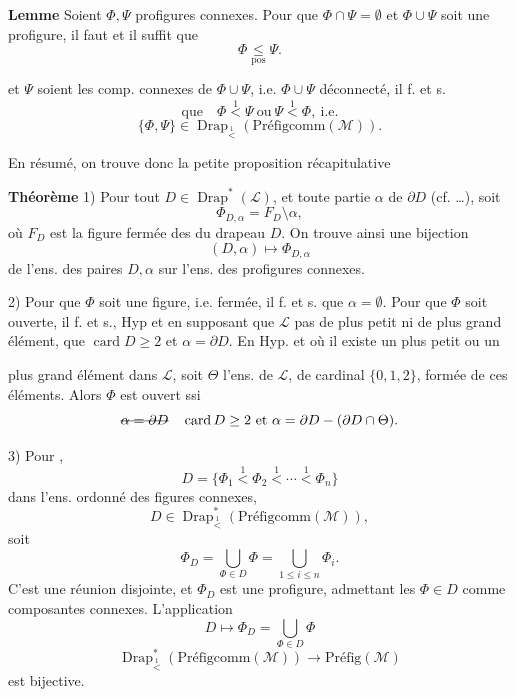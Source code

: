 \documentclass[11pt,a4paper]{article}
\begin{document}
\textbf{Lemme} Soient $\Phi,\Psi$ profigures connexes. Pour que $\Phi\cap\Psi=\emptyset$ et $\Phi\cup\Psi$ soit une profigure,  il faut et il suffit que
\[ \Phi \underset{\mathrm{pos}}{\leq} \Psi . \]
 \struck{\ill{}}

et $\Psi$ soient les comp. connexes de $\Phi\cup\Psi$, i.e. $\Phi\cup\Psi$ déconnecté, il f. et s.
\[ \text{que}\quad \Phi \overset{1}{<} \Psi \ \text{ou}\ \Psi \overset{1}{<} \Phi, \ \text{i.e.} \]
\[ \{\Phi,\Psi\} \in \operatorname{Drap}_{\overset{1}{<}}(\text{Préfigcomm}(\mathcal{M})) . \]

En résumé, on trouve donc la petite proposition récapitulative

\textbf{Théorème} 1) Pour tout $D\in\operatorname{Drap}^*(\mathcal{L})$, et toute partie $\alpha$ de \struck{$\delta$}$\partial D$ (cf. …), soit
\[ \Phi_{D,\alpha} = F_D\setminus\alpha , \]
où $F_D$ est la figure fermée des   du drapeau $D$. On trouve ainsi une bijection
\[ (D,\alpha) \longmapsto \Phi_{D,\alpha} \]
de l'ens. des paires $D,\alpha$ sur l'ens. des profigures connexes.


2) Pour que $\Phi$ soit une figure, i.e. fermée, il f. et s. que $\alpha=\emptyset$. Pour que $\Phi$ soit ouverte, \struck{\ill{}} il f. et s.,   Hyp \struck{\ill{}} et en supposant que $\mathcal{L}$  pas de plus petit ni de plus grand élément, que $\operatorname{card}D\geq 2$ et $\alpha=\partial D$. En    Hyp. et   où il existe un plus petit ou un

plus grand élément dans $\mathcal{L}$, soit \struck{$\xi$} $\Theta$ l'ens.  de $\mathcal{L}$, de cardinal $\{0,1,2\}$, formée de ces éléments. Alors $\Phi$ est ouvert ssi
\[ \text{\struck{$\alpha=\partial D$}}\quad \operatorname{card}D\geq 2 \ \text{et}\ \alpha = \partial D - (\partial D\cap\Theta) . \]

3) Pour   ,
\[ D = \{\Phi_1 \overset{1}{<} \Phi_2 \overset{1}{<} \cdots \overset{1}{<} \Phi_n\} \]
dans l'ens. ordonné des figures connexes,
\[ D \in \operatorname{Drap}^*_{\overset{1}{<}}(\text{Préfigcomm}(\mathcal{M})), \]
soit
\[ \Phi_D = \bigcup_{\Phi\in D}\Phi = \bigcup_{1\leq i\leq n}\Phi_i . \]
C'est une réunion disjointe, et \struck{\ill{}} $\Phi_D$ est une profigure, admettant les $\Phi\in D$ comme composantes connexes.
L'application
\[ D \longmapsto \Phi_D = \bigcup_{\Phi\in D}\Phi \]
\[ \operatorname{Drap}^*_{\overset{1}{<}}(\text{Préfigcomm}(\mathcal{M})) \longrightarrow \text{Préfig}(\mathcal{M}) \]
est bijective. 
\end{document}
